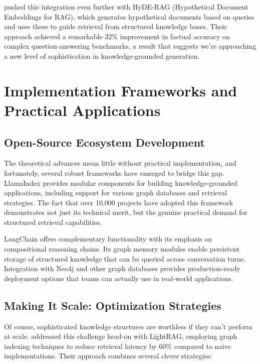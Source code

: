\citet{wang2024hyde} pushed this integration even further with HyDE-RAG (Hypothetical Document Embeddings for RAG), which generates hypothetical documents based on queries and uses these to guide retrieval from structured knowledge bases. Their approach achieved a remarkable 32\% improvement in factual accuracy on complex question-answering benchmarks, a result that suggests we're approaching a new level of sophistication in knowledge-grounded generation.

\section{Implementation Frameworks and Practical Applications}

\subsection{Open-Source Ecosystem Development}

The theoretical advances mean little without practical implementation, and fortunately, several robust frameworks have emerged to bridge this gap. LlamaIndex \citep{liu2022llamaindex} provides modular components for building knowledge-grounded applications, including support for various graph databases and retrieval strategies. The fact that over 10,000 projects have adopted this framework demonstrates not just its technical merit, but the genuine practical demand for structured retrieval capabilities.

LangChain \citep{chase2022langchain} offers complementary functionality with its emphasis on compositional reasoning chains. Its graph memory modules enable persistent storage of structured knowledge that can be queried across conversation turns. Integration with Neo4j and other graph databases provides production-ready deployment options that teams can actually use in real-world applications.

\subsection{Making It Scale: Optimization Strategies}

Of course, sophisticated knowledge structures are worthless if they can't perform at scale. \citet{guo2024lightrag} addressed this challenge head-on with LightRAG, employing graph indexing techniques to reduce retrieval latency by 60\% compared to naive implementations. Their approach combines several clever strategies:


